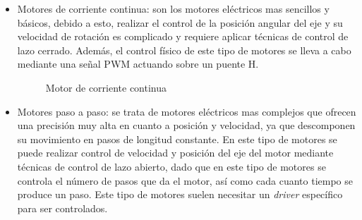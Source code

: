 \begin{itemize}
    \item Motores de corriente continua: son los motores eléctricos mas sencillos y básicos, debido a esto, realizar el control de la posición angular del eje y su velocidad de rotación es complicado y requiere aplicar técnicas de control de lazo cerrado. Además, el control físico de este tipo de motores se lleva a cabo mediante una señal PWM actuando sobre un puente H.
 
    \begin{figure}[htbp]
    \centering
    \caption{Motor de corriente continua} \label{fig:lego}
    \end{figure}


    \item Motores paso a paso: se trata de motores eléctricos mas complejos que ofrecen una precisión muy alta en cuanto a posición y velocidad, ya que descomponen su movimiento en pasos de longitud constante. En este tipo de motores se puede realizar control de velocidad y posición del eje del motor mediante técnicas de control de lazo abierto, dado que en este tipo de motores se controla el número de pasos que da el motor, así como cada cuanto tiempo se produce un paso. Este tipo de motores suelen necesitar un \textit{driver} específico para ser controlados.
    

\end{itemize}
